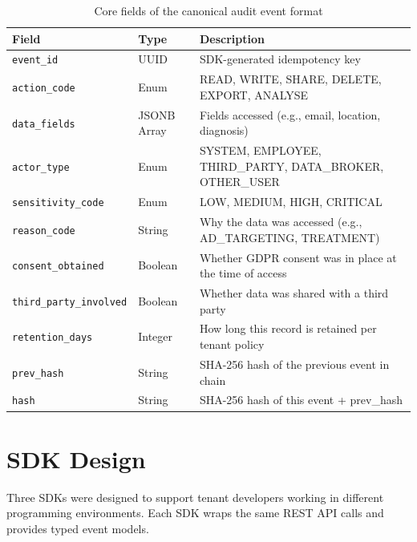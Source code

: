 \documentclass[a4paper,12pt,onecolumn]{report}
\begin{document}
\begin{table}[h]
    \begin{center}
        \begin{tabular}{|l|l|p{6cm}|}
            \hline
            \textbf{Field} & \textbf{Type} & \textbf{Description} \\
            \hline
            \texttt{event\_id} & UUID & SDK-generated idempotency key \\
            \hline
            \texttt{action\_code} & Enum & READ, WRITE, SHARE, DELETE, EXPORT, ANALYSE \\
            \hline
            \texttt{data\_fields} & JSONB Array & Fields accessed (e.g., email, location, diagnosis) \\
            \hline
            \texttt{actor\_type} & Enum & SYSTEM, EMPLOYEE, THIRD\_PARTY, DATA\_BROKER, OTHER\_USER \\
            \hline
            \texttt{sensitivity\_code} & Enum & LOW, MEDIUM, HIGH, CRITICAL \\
            \hline
            \texttt{reason\_code} & String & Why the data was accessed (e.g., AD\_TARGETING, TREATMENT) \\
            \hline
            \texttt{consent\_obtained} & Boolean & Whether GDPR consent was in place at the time of access \\
            \hline
            \texttt{third\_party\_involved} & Boolean & Whether data was shared with a third party \\
            \hline
            \texttt{retention\_days} & Integer & How long this record is retained per tenant policy \\
            \hline
            \texttt{prev\_hash} & String & SHA-256 hash of the previous event in chain \cite{hashchain} \\
            \hline
            \texttt{hash} & String & SHA-256 hash of this event + prev\_hash \cite{hashchain} \\
            \hline
        \end{tabular}
    \end{center}
    \caption{Core fields of the canonical audit event format}
    \label{tab:event-fields}
\end{table}

\section{SDK Design}

Three SDKs were designed to support tenant developers working in different programming environments.
Each SDK wraps the same REST API calls and provides typed event models.
\end{document}
